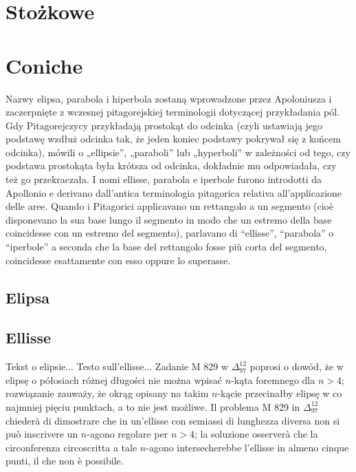 
%

\chapter{Stożkowe} %
\chapter{Coniche} %

Nazwy elipsa, parabola i hiperbola zostaną wprowadzone przez Apoloniusza i zaczerpnięte z wczesnej pitagorejskiej terminologii dotyczącej przykładania pól. Gdy Pitagorejczycy przykładają prostokąt do odcinka (czyli ustawiają jego podstawę wzdłuż odcinka tak, że jeden koniec podstawy pokrywał się z końcem odcinka), mówili o „ellipsie'', „paraboli'' lub „hyperboli'' w zależności od tego, czy podstawa prostokąta była krótsza od odcinka, dokładnie mu odpowiadała, czy też go przekraczała. %
I nomi ellisse, parabola e iperbole furono introdotti da Apollonio e derivano dall'antica terminologia pitagorica relativa all'applicazione delle aree. Quando i Pitagorici applicavano un rettangolo a un segmento (cioè disponevano la sua base lungo il segmento in modo che un estremo della base coincidesse con un estremo del segmento), parlavano di ``ellisse'', ``parabola'' o ``iperbole'' a seconda che la base del rettangolo fosse più corta del segmento, coincidesse esattamente con esso oppure lo superasse. %


\section{Elipsa} %
\section{Ellisse} %

Tekst o elipsie... %
Testo sull'ellisse... %
Zadanie M 829 w $\Delta_{97}^{12}$ poprosi o dowód, że w elipsę o półosiach różnej długości nie można wpisać $n$-kąta foremnego dla $n > 4$; rozwiązanie zauważy, że okrąg opisany na takim $n$-kącie przecinałby elipsę w co najmniej pięciu punktach, a to nie jest możliwe. %
Il problema M 829 in $\Delta_{97}^{12}$ chiederà di dimostrare che in un'ellisse con semiassi di lunghezza diversa non si può inscrivere un $n$-agono regolare per $n > 4$; la soluzione osserverà che la circonferenza circoscritta a tale $n$-agono intersecherebbe l'ellisse in almeno cinque punti, il che non è possibile. %

